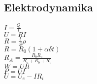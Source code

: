 \documentclass{article}
\begin{document}
\subsection*{Elektrodynamika}
\begin{multicols}{4}
\noindent $I=\frac{Q}{t}$\\
$U=RI$\\
$R=\frac{l}{S}\rho$\\
$R = R_0(1+\alpha \delta t)$\\
$R_A=\frac{R_bR_c}{R_a+R_b+R_c}$\\
$W=UIt$\\
$P=UI$\\
$U=U_e-IR_i$

\end{multicols}
\end{document}

